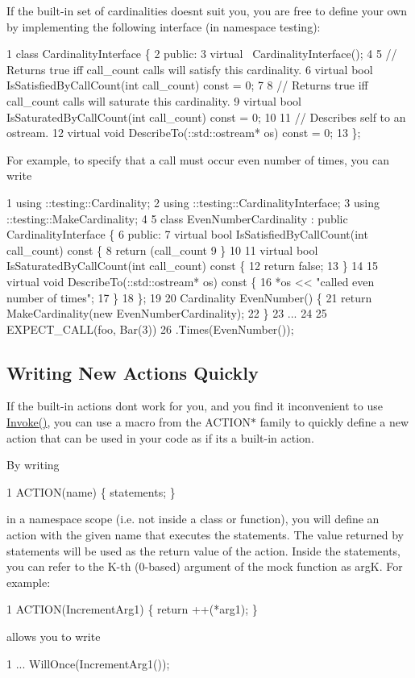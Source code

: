 If the built-\/in set of cardinalities doesn\textquotesingle{}t suit you, you are free to define your own by implementing the following interface (in namespace {\ttfamily testing})\+:


\begin{DoxyCode}
1 class CardinalityInterface \{
2  public:
3   virtual ~CardinalityInterface();
4 
5   // Returns true iff call\_count calls will satisfy this cardinality.
6   virtual bool IsSatisfiedByCallCount(int call\_count) const = 0;
7 
8   // Returns true iff call\_count calls will saturate this cardinality.
9   virtual bool IsSaturatedByCallCount(int call\_count) const = 0;
10 
11   // Describes self to an ostream.
12   virtual void DescribeTo(::std::ostream* os) const = 0;
13 \};
\end{DoxyCode}


For example, to specify that a call must occur even number of times, you can write


\begin{DoxyCode}
1 using ::testing::Cardinality;
2 using ::testing::CardinalityInterface;
3 using ::testing::MakeCardinality;
4 
5 class EvenNumberCardinality : public CardinalityInterface \{
6  public:
7   virtual bool IsSatisfiedByCallCount(int call\_count) const \{
8     return (call\_count %
9   \}
10 
11   virtual bool IsSaturatedByCallCount(int call\_count) const \{
12     return false;
13   \}
14 
15   virtual void DescribeTo(::std::ostream* os) const \{
16     *os << "called even number of times";
17   \}
18 \};
19 
20 Cardinality EvenNumber() \{
21   return MakeCardinality(new EvenNumberCardinality);
22 \}
23 ...
24 
25   EXPECT\_CALL(foo, Bar(3))
26       .Times(EvenNumber());
\end{DoxyCode}


\subsection*{Writing New Actions Quickly}

If the built-\/in actions don\textquotesingle{}t work for you, and you find it inconvenient to use {\ttfamily \hyperlink{namespacetesting_a12aebaf8363d49a383047529f798b694}{Invoke()}}, you can use a macro from the {\ttfamily A\+C\+T\+I\+O\+N$\ast$} family to quickly define a new action that can be used in your code as if it\textquotesingle{}s a built-\/in action.

By writing 
\begin{DoxyCode}
1 ACTION(name) \{ statements; \}
\end{DoxyCode}
 in a namespace scope (i.\+e. not inside a class or function), you will define an action with the given name that executes the statements. The value returned by {\ttfamily statements} will be used as the return value of the action. Inside the statements, you can refer to the K-\/th (0-\/based) argument of the mock function as {\ttfamily argK}. For example\+: 
\begin{DoxyCode}
1 ACTION(IncrementArg1) \{ return ++(*arg1); \}
\end{DoxyCode}
 allows you to write 
\begin{DoxyCode}
1 ... WillOnce(IncrementArg1());
\end{DoxyCode}



